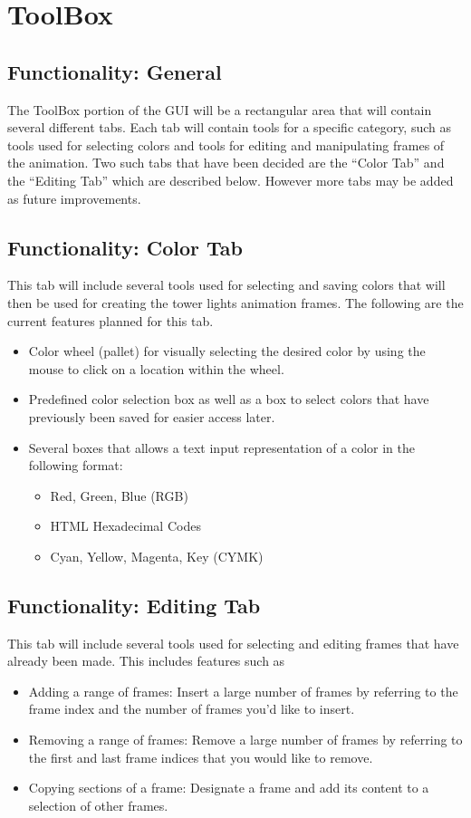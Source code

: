 \documentclass{article}
\begin{document}
	\section{ToolBox}
	
	\subsection{Functionality: General}
	The ToolBox portion of the GUI will be a rectangular area that will contain several different tabs. Each tab will contain tools for a specific category, such as tools used for selecting colors and tools for editing and manipulating frames of the animation. Two such tabs that have been decided are the “Color Tab” and the “Editing Tab” which are described below. However more tabs may be added as future improvements.
	\subsection{Functionality: Color Tab}
This tab will include several tools used for selecting and saving colors that will then be used for creating the tower lights animation frames. The following are the current features planned for this tab.
	\begin{itemize}
			\item Color wheel (pallet) for visually selecting the desired color by using the mouse to click on a location within the wheel.
			\item Predefined color selection box as well as a box to select colors that have previously been saved for easier access later.
			\item Several  boxes that allows a text input representation of a color in the following format:
		\begin{itemize}
				\item Red, Green, Blue (RGB)
				\item HTML Hexadecimal Codes
				\item Cyan, Yellow, Magenta, Key (CYMK)
		\end{itemize}
	\end{itemize}

	\subsection{Functionality: Editing Tab}
	This tab will include several tools used for selecting and editing frames that have already been made. This includes features such as
	\begin{itemize}
			\item Adding a range of frames: Insert a large number of frames by referring to the frame index and the number of frames you'd like to insert.
			\item Removing a range of frames: Remove a large number of frames by referring to the first and last frame indices that you would like to remove.
			\item Copying sections of a frame: Designate a frame and add its content to a selection of other frames.
	\end{itemize}
	
\end{document}
